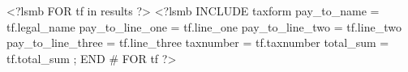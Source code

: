 \documentclass[usletter]{article}
\begin{document}
<?lsmb FOR tf in results ?>
<?lsmb INCLUDE taxform
pay_to_name = tf.legal_name
pay_to_line_one = tf.line_one
pay_to_line_two = tf.line_two
pay_to_line_three = tf.line_three
taxnumber = tf.taxnumber
total_sum = tf.total_sum ;
END # FOR tf  ?>
\end{document}
